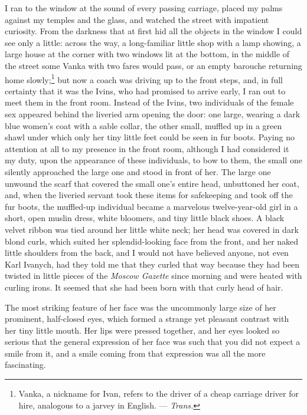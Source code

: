 I ran to the window at the sound of every passing carriage, placed my palms against my temples and the glass, and watched the street with impatient curiosity. From the darkness that at first hid all the objects in the window I could see only a little: across the way, a long-familiar little shop with a lamp showing, a large house at the corner with two windows lit at the bottom, in the middle of the street some Vanka with two fares would pass, or an empty barouche returning home slowly;\footnote{Vanka, a nickname for Ivan, refers to the driver of a cheap carriage driver for hire, analogous to a jarvey in English. --- \textit{Trans.}} but now a coach was driving up to the front steps, and, in full certainty that it was the Ivins, who had promised to arrive early, I ran out to meet them in the front room. Instead of the Ivins, two individuals of the female sex appeared behind the liveried arm opening the door: one large, wearing a dark blue women's coat with a sable collar, the other small, muffled up in a green shawl under which only her tiny little feet could be seen in fur boots. Paying no attention at all to my presence in the front room, although I had considered it my duty, upon the appearance of these individuals, to bow to them, the small one silently approached the large one and stood in front of her. The large one unwound the scarf that covered the small one's entire head, unbuttoned her coat, and, when the liveried servant took these items for safekeeping and took off the fur boots, the muffled-up individual became a marvelous twelve-year-old girl in a short, open muslin dress, white bloomers, and tiny little black shoes. A black velvet ribbon was tied around her little white neck; her head was covered in dark blond curls, which suited her splendid-looking face from the front, and her naked little shoulders from the back, and I would not have believed anyone, not even Karl Ivanych, had they told me that they curled that way because they had been twisted in little pieces of the \textit{Moscow Gazette} since morning and were heated with curling irons. It seemed that she had been born with that curly head of hair.

The most striking feature of her face was the uncommonly large size of her prominent, half-closed eyes, which formed a strange yet pleasant contrast with her tiny little mouth. Her lips were pressed together, and her eyes looked so serious that the general expression of her face was such that you did not expect a smile from it, and a smile coming from that expression was all the more fascinating.

